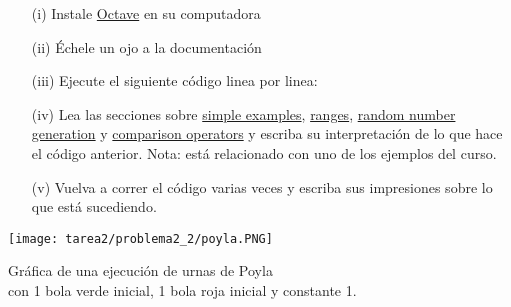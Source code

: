 \begin{problema}
    \begin{enumerate}
        \item[(i)] 
            Instale \href{www.octave.org}{Octave} en su computadora
        \item[(ii)] 
            \'Echele un ojo a la documentaci\'on
        \item[(iii)] 
            Ejecute el siguiente c\'odigo linea por linea: 
        \item[(iv)] 
            Lea las secciones sobre 
            \href{http://www.gnu.org/software/octave/doc/interpreter/Simple-Examples.html#Simple-Examples}{simple examples}, 
            \href{http://www.gnu.org/software/octave/doc/interpreter/Ranges.html#Ranges}{ranges}, 
            \href{http://www.gnu.org/software/octave/doc/interpreter/Random-Number-Generation.html#Random-Number-Generation}{random number generation} 
            y 
            \href{http://www.gnu.org/software/octave/doc/interpreter/Comparison-Ops.html#Comparison-Ops}{comparison operators} 
            y escriba su interpretaci\'on de lo que hace el c\'odigo anterior. Nota: est\'a relacionado con uno de los ejemplos del curso.
        \item[(v)] 
            Vuelva a correr el c\'odigo varias veces y escriba sus impresiones sobre lo que est\'a sucediendo.
    \end{enumerate}
\end{problema}

\begin{center}
    \texttt{[image: tarea2/problema2\_2/poyla.PNG]}
\end{center}
\begin{center}
    Gráfica de una ejecución de urnas de Poyla \\
    con 1 bola verde inicial, 1 bola roja inicial y constante 1.
\end{center}